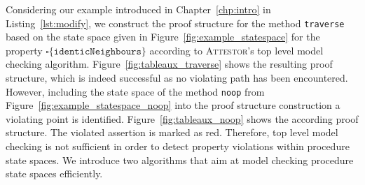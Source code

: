 \documentclass[a4paper, 12pt, twoside]{report}
\begin{document}
	Considering our example introduced in Chapter~\ref{chp:intro} in Listing~\ref{lst:modify}, we construct the proof structure for the method \texttt{traverse} based on the state space given in Figure~\ref{fig:example_statespace} for the property $\square \{\texttt{identicNeighbours}\}$ according to \textsc{Attestor}'s top level model checking algorithm. Figure~\ref{fig:tableaux_traverse} shows the resulting proof structure, which is indeed successful as no violating path has been encountered. However, including the state space of the method \texttt{noop} from Figure~\ref{fig:example_statespace_noop} into the proof structure construction a violating point is identified. Figure~\ref{fig:tableaux_noop} shows the according proof structure. The violated assertion is marked as red. Therefore, top level model checking is not sufficient in order to detect property violations within procedure state spaces. We introduce two algorithms that aim at model checking procedure state spaces efficiently.\\
	
\end{document}
